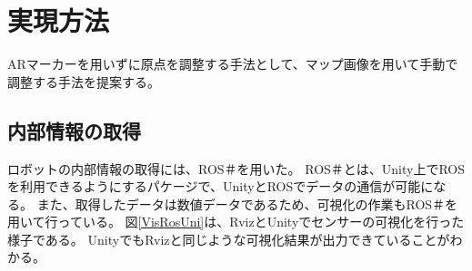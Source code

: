 \chapter{実現方法}\label{chap:method}

ARマーカーを用いずに原点を調整する手法として、マップ画像を用いて手動で調整する手法を提案する。


\section{内部情報の取得}

ロボットの内部情報の取得には、ROS＃を用いた。
ROS＃とは、Unity上でROSを利用できるようにするパケージで、UnityとROSでデータの通信が可能になる。
また、取得したデータは数値データであるため、可視化の作業もROS＃を用いて行っている。
図\ref{VisRosUni}は、RvizとUnityでセンサーの可視化を行った様子である。
UnityでもRvizと同じような可視化結果が出力できていることがわかる。


